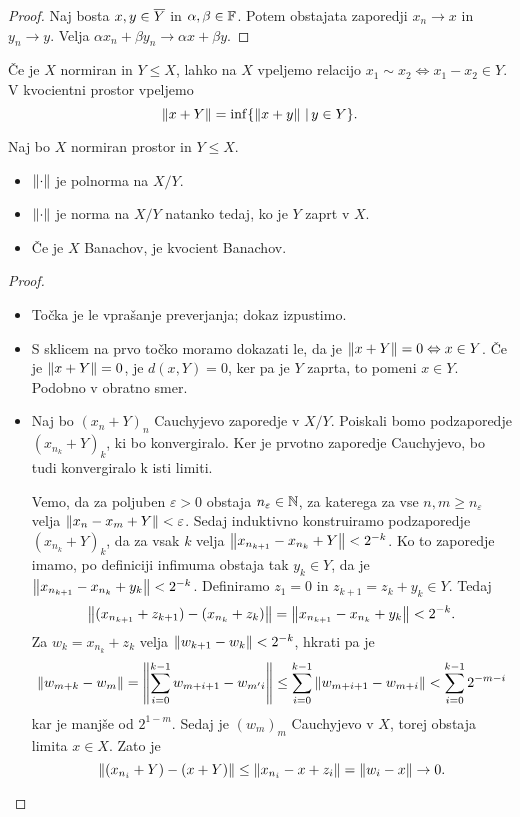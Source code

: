 \begin{proof}
  Naj bosta $x, y \in \overline{Y}$ in $\alpha, \beta \in \mathbb{F}$.
  Potem obstajata zaporedji $x_n \to x$ in $y_n \to y$.
  Velja $\alpha x_n + \beta y_n \to \alpha x + \beta y$.
\end{proof}

Če je $X$ normiran in $Y \le X$, lahko na $X$ vpeljemo relacijo $x_1 \sim x_2
\iff x_1 - x_2 \in Y$.
V kvocientni prostor vpeljemo
\[
  \left\lVert x + Y\right\rVert = \inf \{ \left\lVert x+y\right\rVert \,|\, y \in Y \}.
\]

\begin{trditev}
  Naj bo $X$ normiran prostor in $Y \le X$.
  \begin{itemize}
  \item $\left\lVert\cdot\right\rVert$ je polnorma na $X/Y$.
  \item $\left\lVert\cdot\right\rVert$ je norma na $X/Y$ natanko tedaj, ko je $Y$ zaprt v $X$.
  \item Če je $X$ Banachov, je kvocient Banachov.
  \end{itemize}
\end{trditev}

\begin{proof} \hfill
  \begin{itemize}
  \item Točka je le vprašanje preverjanja; dokaz izpustimo.
  \item S sklicem na prvo točko moramo dokazati le, da je $\left\lVert x + Y\right\rVert = 0 \Leftrightarrow
	x \in Y$.
	Če je $\left\lVert x + Y\right\rVert = 0$, je $d(x, Y) = 0$, ker pa je $Y$ zaprta, to pomeni
	$x \in Y$.
	Podobno v obratno smer.

  \item Naj bo $(x_n + Y)_n$ Cauchyjevo zaporedje v $X/Y$.
	Poiskali bomo podzaporedje $(x_{n_k} + Y)_k$, ki bo konvergiralo.
	Ker je prvotno zaporedje Cauchyjevo, bo tudi konvergiralo k isti limiti.

	Vemo, da za poljuben $\varepsilon > 0$ obstaja $n_\varepsilon \in \mathbb{N}$, za
	katerega za vse $n, m \ge n_\varepsilon$ velja $\left\lVert x_n - x_m + Y\right\rVert <
	\varepsilon$.
	Sedaj induktivno konstruiramo podzaporedje $(x_{n_k} + Y)_k$, da za vsak $k$
	velja $\left\lVert x_{n_{k+1}} -x_{n_k} + Y\right\rVert < 2^{-k}$.
	Ko to zaporedje imamo, po definiciji infimuma obstaja tak $y_k \in Y$, da je
	$\left\lVert x_{n_{k+1}} - x_{n_k} + y_k\right\rVert < 2^{-k}$.
	Definiramo $z_1 = 0$ in $z_{k+1} = z_k + y_k \in Y$.
	Tedaj
	\[
	  \left\lVert(x_{n_{k+1}} + z_{k+1}) - (x_{n_k} + z_k)\right\rVert = \left\lVert x_{n_{k+1}} -
		x_{n_k} + y_k\right\rVert < 2^{-k}.
	\]
	Za $w_k = x_{n_k} + z_k$ velja $\left\lVert w_{k+1} - w_k\right\rVert < 2^{-k}$, hkrati pa je
	\[
	  \left\lVert w_{m+k} - w_m\right\rVert = \left\lVert\sum_{i=0}^{k-1} w_{m+i+1} - w_{m'i}\right\rVert
	  \le \sum_{i=0}^{k-1} \left\lVert w_{m+i+1} - w_{m+i}\right\rVert
	  < \sum_{i=0}^{k-1} 2^{-m-i}
	\]
	kar je manjše od $2^{1-m}$.
	Sedaj je $(w_m)_m$ Cauchyjevo v $X$, torej obstaja limita $x \in X$.
	Zato je
	\[
	  \left\lVert(x_{n_i} + Y) - (x + Y)\right\rVert \le \left\lVert x_{n_i} - x + z_i\right\rVert
	  = \left\lVert w_i - x\right\rVert \to 0.
	  \qedhere
	\]
  \end{itemize}
\end{proof}

